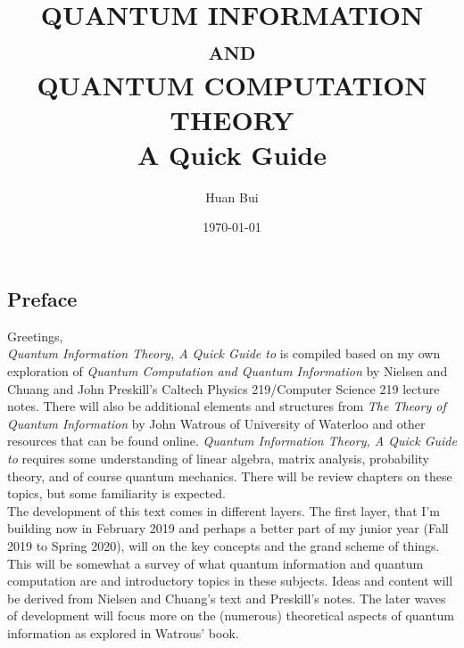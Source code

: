 \documentclass{article}
\theoremstyle{definition}
\begin{document}
	\begin{titlepage}\centering
		\clearpage
		\title{\textsc{\bf{QUANTUM INFORMATION\\
			and\\
		QUANTUM COMPUTATION THEORY}}\\\smallskip A Quick Guide\\}
		\author{\bigskip Huan Bui}
		\date{\today}
		\maketitle
		\thispagestyle{empty}
	\end{titlepage}

\newpage

\subsection*{Preface}

Greetings,\\

\textit{Quantum Information Theory, A Quick Guide to} is compiled based on my own exploration of \textit{Quantum Computation and Quantum Information} by Nielsen and Chuang and John Preskill's Caltech Physics 219/Computer Science 219 lecture notes. There will also be additional elements and structures from \textit{The Theory of Quantum Information} by John Watrous of University of Waterloo and other resources that can be found online. \textit{Quantum Information Theory, A Quick Guide to} requires some understanding of linear algebra, matrix analysis, probability theory, and of course quantum mechanics. There will be review chapters on these topics, but some familiarity is expected.  \\

The development of this text comes in different layers. The first layer, that I'm building now in February 2019 and perhaps a better part of my junior year (Fall 2019 to Spring 2020), will on the key concepts and the grand scheme of things. This will be somewhat a survey of what quantum information and quantum computation are and introductory topics in these subjects. Ideas and content will be derived from Nielsen and Chuang's text and Preskill's notes. The later waves of development will focus more on the (numerous) theoretical aspects of quantum information as explored in Watrous' book. \\
\end{document}
